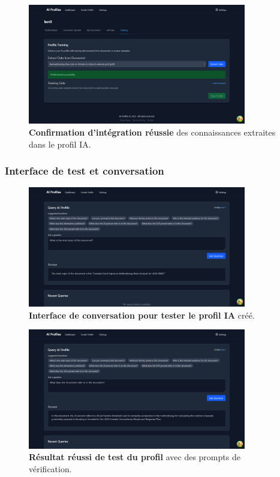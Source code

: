 \begin{figure}[H]
  \centering
  \includegraphics[width=0.85\textwidth,keepaspectratio]{pfe-pics/ai-profile-creation/succesful_knoladge_integration.png}
  \caption{\textbf{Confirmation d'intégration réussie} des connaissances extraites dans le profil IA.}
  \label{fig:knowledge_integration}
\end{figure}

\subsubsection{Interface de test et conversation}

\begin{figure}[H]
  \centering
  \includegraphics[width=0.85\textwidth,keepaspectratio]{pfe-pics/ai-profile-creation/chat_interface_to_test_the_profile.png}
  \caption{\textbf{Interface de conversation pour tester le profil IA} créé.}
  \label{fig:profile_testing}
\end{figure}

\begin{figure}[H]
  \centering
  \includegraphics[width=0.85\textwidth,keepaspectratio]{pfe-pics/ai-profile-creation/chat_interface_for_testing_profile_2_test_prompt_succes.png}
  \caption{\textbf{Résultat réussi de test du profil} avec des prompts de vérification.}
  \label{fig:profile_test_success}
\end{figure}


